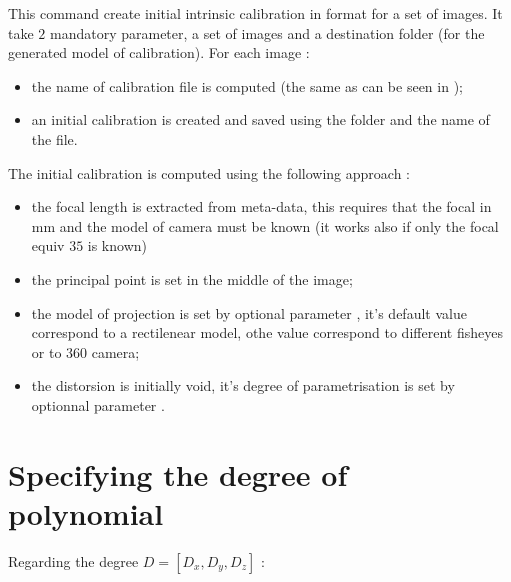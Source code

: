 \documentclass[a4paper]{article}
\begin{document}
\CmdTitle

\tableofcontents



\SecDescr

This command create  initial intrinsic calibration  in \MMVII format for a
set of images. It take $2$ mandatory parameter, a set of images and a destination folder
(for the generated model of calibration). 
For each image :


\begin{itemize}
   \item  the name of calibration file is computed (the same as can be seen in );
   \item  an initial calibration is created and saved using the folder and the name of the file.
\end{itemize}

The initial calibration is computed using the following approach :


\begin{itemize}
   \item the focal length is extracted from meta-data, this requires that the focal in mm
         and the model of camera must be known (it works also if only the focal equiv $35$ is known)
   \item the principal point is set in the middle of the image;
   \item the model of projection is set by optional parameter , it's default
         value  correspond to a rectilenear model, othe value correspond to
         different fisheyes or to $360$ camera;
   \item the distorsion is initially void, it's degree of parametrisation is set
         by optionnal parameter .
\end{itemize}


\section{Specifying the degree of polynomial}

Regarding the degree $D=[D_x,D_y,D_z]$ :
\end{document}
